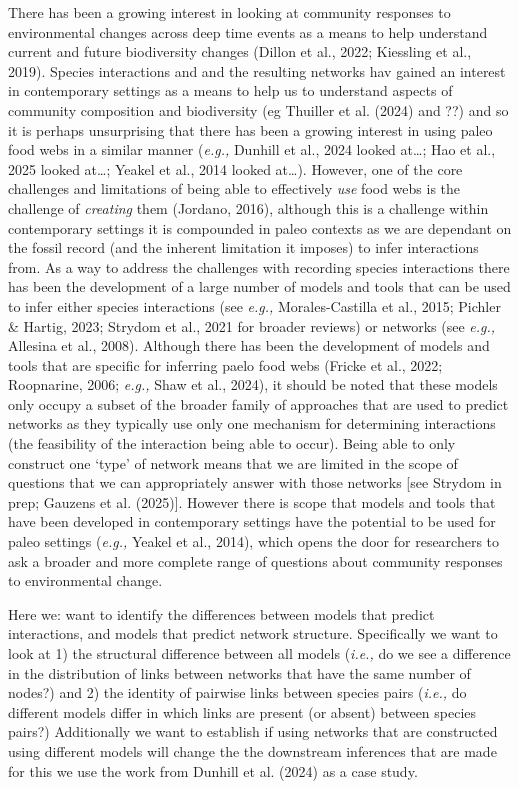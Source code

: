 \documentclass[
]{article}
\begin{document}
There has been a growing interest in looking at community responses to
environmental changes across deep time events as a means to help
understand current and future biodiversity changes (Dillon et al., 2022;
Kiessling et al., 2019). Species interactions and and the resulting
networks hav gained an interest in contemporary settings as a means to
help us to understand aspects of community composition and biodiversity
(eg Thuiller et al. (2024) and ??) and so it is perhaps unsurprising
that there has been a growing interest in using paleo food webs in a
similar manner (\emph{e.g.,} Dunhill et al., 2024 looked at\ldots; Hao
et al., 2025 looked at\ldots; Yeakel et al., 2014 looked at\ldots).
However, one of the core challenges and limitations of being able to
effectively \emph{use} food webs is the challenge of \emph{creating}
them (Jordano, 2016), although this is a challenge within contemporary
settings it is compounded in paleo contexts as we are dependant on the
fossil record (and the inherent limitation it imposes) to infer
interactions from. As a way to address the challenges with recording
species interactions there has been the development of a large number of
models and tools that can be used to infer either species interactions
(see \emph{e.g.,} Morales-Castilla et al., 2015; Pichler \& Hartig,
2023; Strydom et al., 2021 for broader reviews) or networks (see
\emph{e.g.,} Allesina et al., 2008). Although there has been the
development of models and tools that are specific for inferring paelo
food webs (Fricke et al., 2022; Roopnarine, 2006; \emph{e.g.,} Shaw et
al., 2024), it should be noted that these models only occupy a subset of
the broader family of approaches that are used to predict networks as
they typically use only one mechanism for determining interactions (the
feasibility of the interaction being able to occur). Being able to only
construct one `type' of network means that we are limited in the scope
of questions that we can appropriately answer with those networks {[}see
Strydom in prep; Gauzens et al. (2025){]}. However there is scope that
models and tools that have been developed in contemporary settings have
the potential to be used for paleo settings (\emph{e.g.,} Yeakel et al.,
2014), which opens the door for researchers to ask a broader and more
complete range of questions about community responses to environmental
change.

Here we: want to identify the differences between models that predict
interactions, and models that predict network structure. Specifically we
want to look at 1) the structural difference between all models
(\emph{i.e.,} do we see a difference in the distribution of links
between networks that have the same number of nodes?) and 2) the
identity of pairwise links between species pairs (\emph{i.e.,} do
different models differ in which links are present (or absent) between
species pairs?) Additionally we want to establish if using networks that
are constructed using different models will change the the downstream
inferences that are made for this we use the work from Dunhill et al.
(2024) as a case study.
\end{document}
